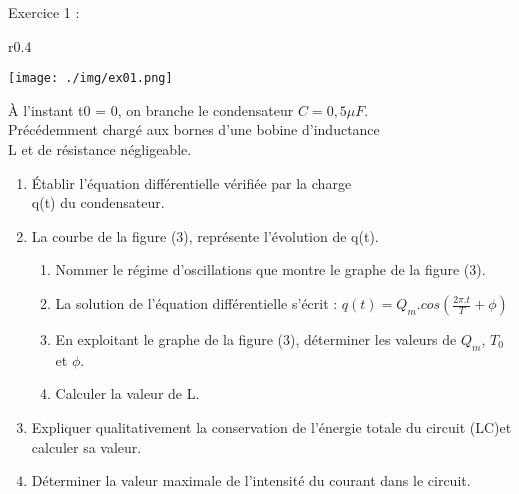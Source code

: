 \documentclass[12pt, french]{article}
\begin{document}
\begin{center}

\vspace{-2cm}
\end{center}

\vspace{-0.5cm}
   \begin{Box2}{Exercice 1 : }
	   \begin{wrapfigure}[0]{r}{0.4\textwidth}
  \begin{center}
	  \vspace{-0.6cm}
	\texttt{[image: ./img/ex01.png]}
  \end{center}
\end{wrapfigure}
À l'instant t0 = 0, on branche le condensateur $C = 0,5 \mu F$. \\Précédemment
chargé aux bornes d'une bobine d'inductance\\ L et de résistance négligeable.
\begin{enumerate}
\item Établir l'équation différentielle vérifiée par la charge\\ q(t) du condensateur.

\item La courbe de la figure (3), représente l'évolution de q(t).
	\begin{enumerate}
\item	Nommer le régime d'oscillations que montre le graphe de la figure (3).

\item La solution de l'équation différentielle s'écrit : $q(t) =Q_m.cos(\frac{2\pi.t}{T} + \phi)$ 

\item En exploitant le graphe de la figure (3), déterminer les valeurs de $Q_m$, $T_0$ et $\phi$.
\item Calculer la valeur de L.
\end{enumerate}
\item Expliquer qualitativement la conservation de l'énergie totale du circuit (LC)et calculer sa valeur.
\item Déterminer la valeur maximale de l'intensité du courant dans le circuit.
\end{enumerate}
   \end{Box2}
\end{document}
